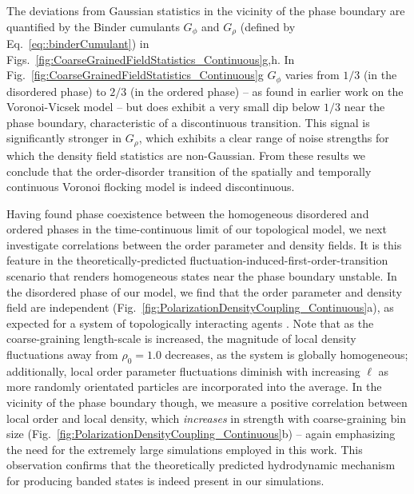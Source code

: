 \documentclass[twoside,twocolumn,9pt]{article}
\begin{document}
The deviations from Gaussian statistics in the vicinity of the phase boundary are quantified by the Binder cumulants $G_{\phi}$ and $G_{\rho}$ (defined by Eq.~\ref{eq::binderCumulant}) in Figs.~\ref{fig:CoarseGrainedFieldStatistics_Continuous}g,h.
In Fig.~\ref{fig:CoarseGrainedFieldStatistics_Continuous}g $G_{\phi}$ varies from $1/3$ (in the disordered phase) to $2/3$ (in the ordered phase) -- as found in earlier work on the Voronoi-Vicsek model \cite{chate2008collective,ginelli2010relevance} -- but does exhibit a very small dip below $1/3$ near the phase boundary, characteristic of a discontinuous transition.
This signal is significantly stronger in $G_{\rho}$, which exhibits a clear range of noise strengths for which the density field statistics are non-Gaussian.
From these results we conclude that the order-disorder transition of the spatially and temporally continuous Voronoi flocking model is indeed discontinuous.




Having found phase coexistence between the homogeneous disordered and ordered phases in the time-continuous limit of our topological model, we next investigate correlations between the order parameter and density fields.
It is this feature in the theoretically-predicted fluctuation-induced-first-order-transition scenario that renders homogeneous states near the phase boundary unstable.
In the disordered phase of our model, we find that the order parameter and density field are independent (Fig.~\ref{fig:PolarizationDensityCoupling_Continuous}a), as expected for a system of topologically interacting agents \cite{chou2012kinetic}.
Note that as the coarse-graining length-scale is increased, the magnitude of local density fluctuations away from $\rho_{0}=1.0$ decreases, as the system is globally homogeneous; additionally, local order parameter fluctuations diminish with increasing $\ell$ as more randomly orientated particles are incorporated into the average.
In the vicinity of the phase boundary though, we measure a positive correlation between local order and local density, which \emph{increases} in strength with coarse-graining bin size (Fig.~\ref{fig:PolarizationDensityCoupling_Continuous}b) -- again emphasizing the need for the extremely large simulations employed in this work.
This observation confirms that the theoretically predicted hydrodynamic mechanism for producing banded states\cite{martin2021fluctuation} is indeed present in our simulations.
\end{document}

